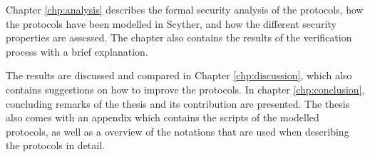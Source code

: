Chapter \ref{chp:analysis} describes the formal security analysis of the protocols, how the protocols have been modelled in Scyther, and how the different security properties are assessed. The chapter also contains the results of the verification process with a brief explanation.

The results are discussed and compared in Chapter \ref{chp:discussion}, which also contains suggestions on how to improve the protocols.  In chapter \ref{chp:conclusion}, concluding remarks of the thesis and its contribution are presented. The thesis also comes with an appendix which contains the scripts of the modelled protocols, as well as a overview of the notations that are used when describing the protocols in detail.